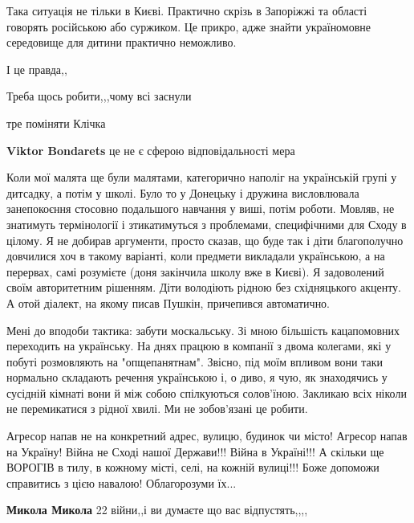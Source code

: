 \begin{itemize}

Така ситуація не тільки в Києві. Практично скрізь в Запоріжжі та області
говорять російською або суржиком. Це прикро, адже знайти україномовне
середовище для дитини практично неможливо.


І це правда,,

\begin{itemize} %
Треба щось робити,,,чому всі заснули
\end{itemize} %

тре поміняти Клічка

\begin{itemize} %
\textbf{Viktor Bondarets} це не є сферою відповідальності мера
\end{itemize} %


Коли мої малята ще були малятами, категорично наполіг на українській групі у
дитсадку, а потім у школі. Було то у Донецьку і дружина висловлювала
занепокоєння стосовно подальшого навчання у виші, потім роботи. Мовляв, не
знатимуть термінології і зтикатимуться з проблемами, специфічними для Сходу в
цілому. Я не добирав аргументи, просто сказав, що буде так і діти благополучно
довчилися хоч в такому варіанті, коли предмети викладали українською, а на
перервах, самі розумієте (доня закінчила школу вже в Києві). Я задоволений
своїм авторитетним рішенням. Діти володіють рідною без східняцького акценту. А
отой діалект, на якому писав Пушкін, причепився автоматично.

Мені до вподоби тактика: забути москальську. Зі мною більшість кацапомовних
переходить на українську. На днях працюю в компанії з двома колегами, які у
побуті розмовляють на "опщепанятнам". Звісно, під моїм впливом вони таки
нормально складають речення українською і, о диво, я чую, як знаходячись у
сусідній кімнаті вони й між собою спілкуються солов'їною. Закликаю всіх ніколи
не перемикатися з рідної хвилі. Ми не зобов'язані це робити.


Агресор напав не на конкретний адрес, вулицю, будинок чи місто! Агресор напав
на Україну!  Війна не Сході нашої Держави!!! Війна в Україні!!! А скільки ще
ВОРОГІВ в тилу, в кожному місті, селі, на кожній вулиці!!!  Боже допоможи
справитись з цією навалою!  Облагорозуми їх...

\begin{itemize} %
\textbf{Микола Микола} 22 війни,,і ви думаєте що вас відпустять,,,,


\end{itemize}
\end{itemize}

